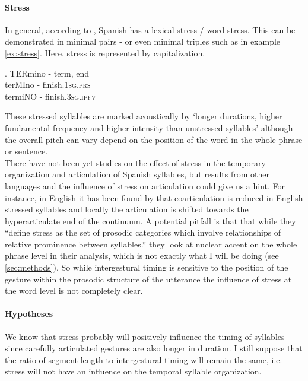 \documentclass[../Proposal.tex]{subfiles}
\begin{document}
\paragraph{Stress} In general, according to \cite{prieto2018prosody}, Spanish has a lexical stress / word stress. This can be demonstrated in minimal pairs - or even minimal triples such as in example \ref{ex:stress}. Here, stress is represented by capitalization.

\ex. TERmino - term, end\\
terMIno - finish.\textsc{1sg.prs}\\
termiNO - finish.\textsc{3sg.ipfv}
\label{ex:stress}

These stressed syllables are marked acoustically by \enquote*{longer durations, higher fundamental frequency and higher intensity than unstressed syllables} \cite[215]{prieto2018prosody} although the overall pitch can vary depend on the position of the word in the whole phrase or sentence. \\
There have not been yet studies on the effect of stress in the temporary organization and articulation of Spanish syllables, but results from other languages and the influence of stress on articulation could give us a hint. For instance, in English it has been found by \cite{dejong1993interplay} that coarticulation is reduced in English stressed syllables and locally the articulation is shifted towards the hyperarticulate end of the continuum. A potential pitfall is that that while they ``define stress as the set of prosodic categories which involve relationships of relative prominence between syllables.''\cite[199]{dejong1993interplay} they look at nuclear accent on the whole phrase level in their analysis, which is not exactly what I will be doing (see \cref{sec:methods}). So while intergestural timing is sensitive to the position of the gesture within the prosodic structure of the utterance the influence of stress at the word level is not completely clear.

\paragraph{Hypotheses} 
We know that stress probably will positively influence the timing of syllables since carefully articulated gestures are also longer in duration. I still suppose that the ratio of segment length to intergestural timing will remain the same, i.e. stress will not have an influence on the temporal syllable organization.
\end{document}
